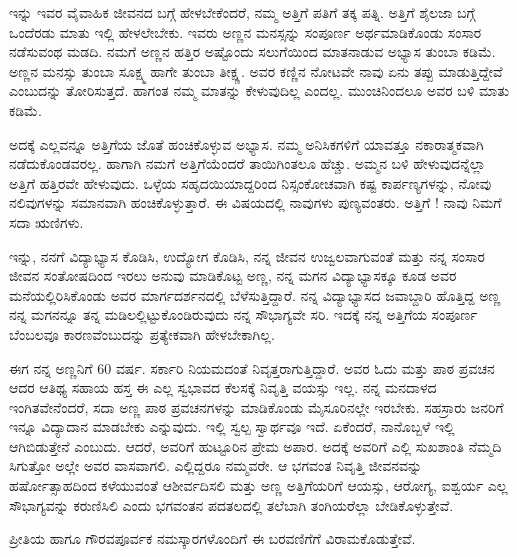 {ಇನ್ನು ಇವರ ವೈವಾಹಿಕ ಜೀವನದ ಬಗ್ಗೆ ಹೇಳಬೇಕೆಂದರೆ, ನಮ್ಮ ಅತ್ತಿಗೆ ಪತಿಗೆ ತಕ್ಕ ಪತ್ನಿ. ಅತ್ತಿಗೆ   \enginline{-}   ಶೈಲಜಾ ಬಗ್ಗೆ ಒಂದೆರಡು ಮಾತು ಇಲ್ಲಿ ಹೇಳಲೇಬೇಕು. ಇವರು ಅಣ್ಣನ ಮನಸ್ಸನ್ನು ಸಂಪೂರ್ಣ ಅರ್ಥಮಾಡಿಕೊಂಡು ಸಂಸಾರ ನಡೆಸುವಂಥ ಮಡದಿ.  ನಮಗೆ ಅಣ್ಣನ ಹತ್ತಿರ ಅಷ್ಟೊಂದು ಸಲುಗೆಯಿಂದ ಮಾತನಾಡುವ ಅಭ್ಯಾಸ ತುಂಬಾ ಕಡಿಮೆ. ಅಣ್ಣನ ಮನಸ್ಸು ತುಂಬಾ ಸೂಕ್ಷ್ಮ ಹಾಗೇ ತುಂಬಾ ತೀಕ್ಷ್ಣ. ಅವರ ಕಣ್ಣಿನ ನೋಟವೇ ನಾವು ಏನು ತಪ್ಪು ಮಾಡುತ್ತಿದ್ದೇವೆ ಎಂಬುದನ್ನು ತೋರಿಸುತ್ತದೆ. ಹಾಗಂತ ನಮ್ಮ ಮಾತನ್ನು ಕೇಳುವುದಿಲ್ಲ ಎಂದಲ್ಲ. ಮುಂಚಿನಿಂದಲೂ ಅವರ ಬಳಿ ಮಾತು ಕಡಿಮೆ.

ಅದಕ್ಕೆ ಎಲ್ಲವನ್ನೂ ಅತ್ತಿಗೆಯ ಜೊತೆ ಹಂಚಿಕೊಳ್ಳುವ ಅಭ್ಯಾಸ. ನಮ್ಮ ಅನಿಸಿಕಗಳಿಗೆ ಯಾವತ್ತೂ ನಕಾರಾತ್ಮಕವಾಗಿ ನಡೆದುಕೊಂಡವರಲ್ಲ.  ಹಾಗಾಗಿ ನಮಗೆ ಅತ್ತಿಗೆಯೆಂದರೆ ತಾಯಿಗಿಂತಲೂ ಹೆಚ್ಚು.  ಅಮ್ಮನ ಬಳಿ ಹೇಳುವುದನ್ನೆಲ್ಲಾ ಅತ್ತಿಗೆ ಹತ್ತಿರವೇ ಹೇಳುವುದು. ಒಳ್ಳೆಯ ಸಹೃದಯಿಯಾದ್ದರಿಂದ ನಿಸ್ಸಂಕೋಚವಾಗಿ ಕಷ್ಟ ಕಾರ್ಪಣ್ಯಗಳನ್ನು, ನೋವು ನಲಿವುಗಳನ್ನು ಸಮಾನವಾಗಿ ಹಂಚಿಕೊಳ್ಳುತ್ತಾರೆ. ಈ ವಿಷಯದಲ್ಲಿ ನಾವುಗಳು ಪುಣ್ಯವಂತರು. ಅತ್ತಿಗೆ ! ನಾವು ನಿಮಗೆ ಸದಾ ಋಣಿಗಳು.

ಇನ್ನು, ನನಗೆ ವಿದ್ಯಾಭ್ಯಾಸ ಕೊಡಿಸಿ, ಉದ್ಯೋಗ ಕೊಡಿಸಿ, ನನ್ನ ಜೀವನ ಉಜ್ವಲ\-ವಾಗುವಂತೆ ಮತ್ತು ನನ್ನ ಸಂಸಾರ ಜೀವನ ಸಂತೋಷದಿಂದ ಇರಲು ಅನುವು ಮಾಡಿಕೊಟ್ಟ ಅಣ್ಣ, ನನ್ನ ಮಗನ ವಿದ್ಯಾಭ್ಯಾಸಕ್ಕೂ ಕೂಡ ಅವರ ಮನೆಯಲ್ಲಿರಿಸಿಕೊಂಡು ಅವರ ಮಾರ್ಗದರ್ಶನದಲ್ಲಿ ಬೆಳೆಸುತ್ತಿದ್ದಾರೆ.  ನನ್ನ ವಿದ್ಯಾಭ್ಯಾಸದ ಜವಾಬ್ದಾರಿ ಹೊತ್ತಿದ್ದ ಅಣ್ಣ  ನನ್ನ ಮಗನನ್ನೂ ತನ್ನ ಮಡಿಲಲ್ಲಿಟ್ಟುಕೊಂಡಿರುವುದು ನನ್ನ ಸೌಭಾಗ್ಯವೇ ಸರಿ. ಇದಕ್ಕೆ ನನ್ನ ಅತ್ತಿಗೆಯ ಸಂಪೂರ್ಣ ಬೆಂಬಲವೂ ಕಾರಣವೆಂಬುದನ್ನು ಪ್ರತ್ಯೇಕವಾಗಿ ಹೇಳಬೇಕಾಗಿಲ್ಲ. 

ಈಗ ನನ್ನ ಅಣ್ಣನಿಗೆ 60 ವರ್ಷ. ಸರ್ಕಾರಿ ನಿಯಮದಂತೆ ನಿವೃತ್ತರಾಗುತ್ತಿದ್ದಾರೆ. ಅವರ ಓದು ಮತ್ತು ಪಾಠ  \enginline{-}  ಪ್ರವಚನ ಆದರ  \enginline{-}  ಆತಿಥ್ಯ ಸಹಾಯ ಹಸ್ತ ಈ ಎಲ್ಲ ಸ್ವಭಾವದ ಕೆಲಸಕ್ಕೆ ನಿವೃತ್ತಿ ವಯಸ್ಸು ಇಲ್ಲ.  ನನ್ನ ಮನದಾಳದ ಇಂಗಿತವೇನೆಂದರೆ, ಸದಾ ಅಣ್ಣ ಪಾಠ  \enginline{-}  ಪ್ರವಚನಗಳನ್ನು ಮಾಡಿಕೊಂಡು ಮೈಸೂರಿನಲ್ಲೇ ಇರಬೇಕು.  ಸಹಸ್ರಾರು ಜನರಿಗೆ ಇನ್ನೂ ವಿದ್ಯಾದಾನ ಮಾಡಬೇಕು ಎನ್ನುವುದು.  ಇಲ್ಲಿ ಸ್ವಲ್ಪ ಸ್ವಾರ್ಥವೂ ಇದೆ. ಏಕೆಂದರೆ, ನಾನೊಬ್ಬಳೆ ಇಲ್ಲಿ ಆಗಿಬಿಡುತ್ತೇನೆ ಎಂಬುದು.  ಆದರೆ, ಅವರಿಗೆ ಹುಟ್ಟೂರಿನ ಪ್ರೇಮ ಅಪಾರ.  ಅದಕ್ಕೆ ಅವರಿಗೆ ಎಲ್ಲಿ ಸುಖಶಾಂತಿ ನೆಮ್ಮದಿ ಸಿಗುತ್ತೋ ಅಲ್ಲೇ ಅವರ ವಾಸವಾಗಲಿ. ಎಲ್ಲಿದ್ದರೂ ನಮ್ಮವರೇ.  ಆ ಭಗವಂತ  ನಿವೃತ್ತಿ ಜೀವನವನ್ನು ಹರ್ಷೋತ್ಸಾಹದಿಂದ ಕಳೆಯುವಂತೆ ಆಶೀರ್ವದಿಸಲಿ ಮತ್ತು ಅಣ್ಣ ಅತ್ತಿಗೆಯರಿಗೆ ಆಯಸ್ಸು, ಆರೋಗ್ಯ, ಐಶ್ವರ್ಯ ಎಲ್ಲ ಸೌಭಾಗ್ಯವನ್ನು  ಕರುಣಿಸಿಲಿ ಎಂದು ಭಗವಂತನ ಪದತಲದಲ್ಲಿ ತಲೆಬಾಗಿ ತಂಗಿಯರೆಲ್ಲಾ ಬೇಡಿಕೊಳ್ಳುತ್ತೇವೆ.

ಪ್ರೀತಿಯ ಹಾಗೂ ಗೌರವಪೂರ್ವಕ ನಮಸ್ಕಾರಗಳೊಂದಿಗೆ ಈ ಬರವಣಿಗೆಗೆ ವಿರಾಮ\-ಕೊಡುತ್ತೇವೆ.

\articleend
}
